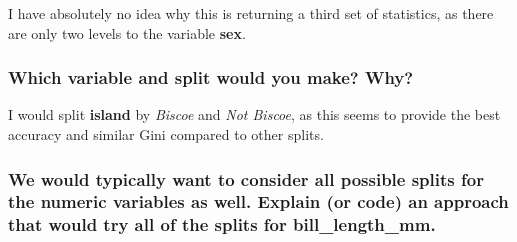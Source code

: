 \documentclass[
]{article}
\begin{document}
I have absolutely no idea why this is returning a third set of
statistics, as there are only two levels to the variable \textbf{sex}.

\subsubsection{Which variable and split would you make?
Why?}\label{which-variable-and-split-would-you-make-why}

I would split \textbf{island} by \emph{Biscoe} and \emph{Not Biscoe}, as
this seems to provide the best accuracy and similar Gini compared to
other splits.

\subsubsection{We would typically want to consider all possible splits
for the numeric variables as well. Explain (or code) an approach that
would try all of the splits for
bill\_length\_mm.}\label{we-would-typically-want-to-consider-all-possible-splits-for-the-numeric-variables-as-well.-explain-or-code-an-approach-that-would-try-all-of-the-splits-for-bill_length_mm.}
\end{document}
